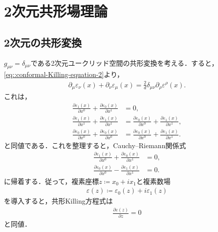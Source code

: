 \chapter{2次元共形場理論}
\section{2次元の共形変換}
\(g_{\mu\nu}=\delta_{\mu\nu}\)である2次元ユークリッド空間の共形変換を考える．すると，
\cref{eq::conformal-Killing-equation-2}より，
\begin{align}
	\partial_{\mu}\varepsilon_{\nu}(x)+\partial_{\nu}\varepsilon_{\mu}(x)=\frac{2}{d}\delta_{\mu\nu}\partial_{\rho}\varepsilon^{\rho}(x).
\end{align}
これは，
\begin{align}
	\frac{\partial{}\varepsilon_{1}(x)}{\partial{}x^{0}}+\frac{\partial{}\varepsilon_{0}(x)}{\partial{}x^{1}} & =0,                                                                                                         \\
	\frac{\partial{}\varepsilon_{1}(x)}{\partial{}x^{1}}+\frac{\partial{}\varepsilon_{1}(x)}{\partial{}x^{1}} & =\frac{\partial{}\varepsilon_{0}(x)}{\partial{}x^{0}}+\frac{\partial{}\varepsilon_{1}(x)}{\partial{}x^{1}}, \\
	\frac{\partial{}\varepsilon_{0}(x)}{\partial{}x^{0}}+\frac{\partial{}\varepsilon_{0}(x)}{\partial{}x^{0}} & =\frac{\partial{}\varepsilon_{0}(x)}{\partial{}x^{0}}+\frac{\partial{}\varepsilon_{1}(x)}{\partial{}x^{1}}.
\end{align}
と同値である．これを整理すると，Cauchy--Riemann関係式
\begin{align}
	\frac{\partial{}\varepsilon_{1}(x)}{\partial{}x^{0}}+\frac{\partial{}\varepsilon_{0}(x)}{\partial{}x^{1}} & =0, \\
	\frac{\partial{}\varepsilon_{0}(x)}{\partial{}x^{0}}-\frac{\partial{}\varepsilon_{1}(x)}{\partial{}x^{1}} & =0.
\end{align}
に帰着する．従って，複素座標\(z\coloneqq{}x_{0}+ix_{1}\)と複素数場
\begin{align}
	\varepsilon(z)\coloneqq{}\varepsilon_{0}(z)+i\varepsilon_{1}(z)
\end{align}
を導入すると，共形Killing方程式は
\begin{align}
	\frac{\partial\varepsilon(z)}{\partial{}z}=0
\end{align}
と同値．
